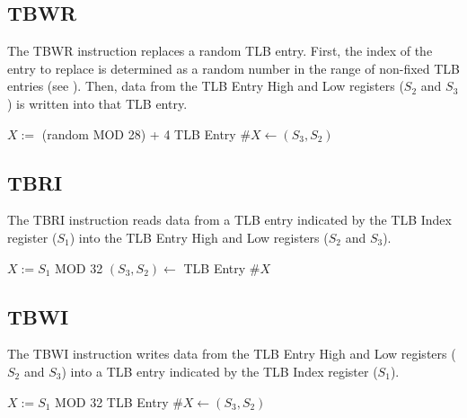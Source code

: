 \subsection{TBWR}

The TBWR instruction replaces a random TLB entry. First, the index of the entry to replace is determined as a random number in the range of non-fixed TLB entries (see ). Then, data from the TLB Entry High and Low registers ($S_2$ and $S_3$) is written into that TLB entry.


\begin{effectize}
\priveffect
\effect $X :=$ (random MOD 28) + 4
\effect TLB Entry \#$X \leftarrow (S_3, S_2)$
\end{effectize}

\subsection{TBRI}

The TBRI instruction reads data from a TLB entry indicated by the TLB Index register ($S_1$) into the TLB Entry High and Low registers ($S_2$ and $S_3$).


\begin{effectize}
\priveffect
\effect $X := S_1$ MOD 32
\effect $(S_3, S_2) \leftarrow$ TLB Entry \#$X$
\end{effectize}

\subsection{TBWI}

The TBWI instruction writes data from the TLB Entry High and Low registers ($S_2$ and $S_3$) into a TLB entry indicated by the TLB Index register ($S_1$).


\begin{effectize}
\priveffect
\effect $X := S_1$ MOD 32
\effect TLB Entry \#$X \leftarrow (S_3, S_2)$
\end{effectize}
